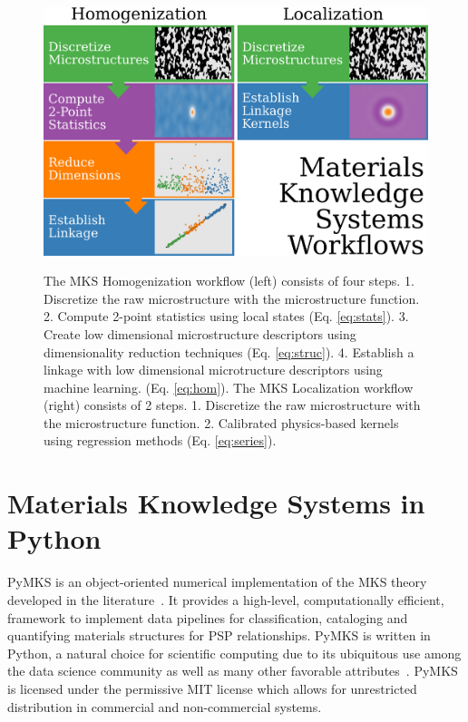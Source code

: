 \documentclass{bmcart}
\begin{document}
\begin{figure}[h!]
  \caption{
     The MKS Homogenization workflow (left) consists of four steps. 1.
     Discretize the raw microstructure with the microstructure function.
     2. Compute 2-point statistics using local states (Eq. \ref{eq:stats}).
     3. Create low dimensional microstructure descriptors using dimensionality
     reduction techniques (Eq. \ref{eq:struc}).
     4. Establish a linkage with low dimensional
     microtructure descriptors using machine learning. (Eq. \ref{eq:hom}).
     The MKS Localization workflow (right) consists of 2 steps.
     1. Discretize the raw microstructure with the microstructure function.
     2. Calibrated physics-based kernels using regression methods (Eq. \ref{eq:series}).}
    \includegraphics[scale=.22]{fig/mks_workflows.png}
  \label{fig:workflows}
\end{figure}


\section{Materials Knowledge Systems in Python}

PyMKS is an object-oriented numerical implementation of the MKS theory
developed in the literature~\cite{kalidindi2010novel}. It provides a
high-level, computationally efficient, framework to implement data
pipelines for classification, cataloging and quantifying materials
structures for PSP relationships. PyMKS is written in Python, a
natural choice for scientific computing due to its ubiquitous use
among the data science community as well as many other favorable
attributes~\cite{perez2011python}. PyMKS is licensed under the
permissive MIT license \cite{MIT} which allows for unrestricted
distribution in commercial and non-commercial systems.
\end{document}
